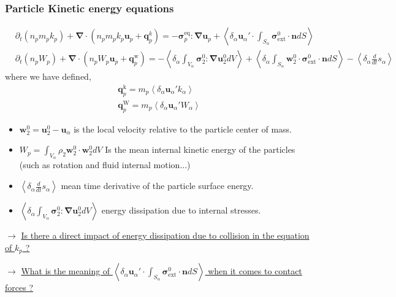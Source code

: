 \documentclass{sintefbeamer}
\newcommand{\pavg}[1]{\left<\delta_\alpha #1\right>}
\newcommand{\ddt}{\frac{d}{d t}}
\newcommand{\pddt}{\partial_t}
\newcommand{\grad}{\mathbf{\nabla}}
\renewcommand{\div}{\mathbf{\nabla}\cdot}
\newcommand{\intO}[1]{\int_{V_\alpha} #1 dV}
\newcommand{\intS}[1]{\int_{S_\alpha} #1 dS}
\newcommand{\pOavg}[1]{\pavg{\intO{#1}}}
\newcommand{\pSavg}[1]{\pavg{\intS{#1}}}
\begin{document}
\begin{frame}
  \frametitle{Particle Kinetic energy equations }
  \footnotesize
  \begin{align*}
    &\pddt \left(n_p m_p k_p\right)
    + \div \left(n_p
    m_p k_p \textbf{u}_p 
    + \textbf{q}^k_p
    \right)
    = 
    - \bm{\sigma}_p^\text{eq}  :\grad \textbf{u}_p
    + \pavg{\textbf{u}_\alpha'\cdot\intS{\bm{\sigma}_\text{ext}^0 \cdot \textbf{n}}}\\
    &\pddt \left(n_p W_p\right)
    + \div 
    (n_p W_p
    \textbf{u}_p 
    +  \textbf{q}_p^\text{w}
    )
    = 
    - \pOavg{{\bm{\sigma}_2^0 : \grad\textbf{u}_2^0}}
    + \pSavg{{\textbf{w}_2^0 \cdot \bm{\sigma}_\text{ext}^0 \cdot  \textbf{n}}}
    - \pavg{\ddt{ s_\alpha}}
\end{align*}
where we have defined, 
\begin{align*}
    \textbf{q}_p^\text{k}
    = m_p \pavg{\textbf{u}_\alpha' k_\alpha} \\
    \textbf{q}_p^\text{W}
    = m_p \pavg{\textbf{u}_\alpha' W_\alpha} 
\end{align*}

\begin{itemize}
  \item $\textbf{w}_2^0 = \textbf{u}_2^0 - \textbf{u}_\alpha$ is the local velocity relative to the particle center of mass. 
  \item $W_p = \intO{\rho_2\textbf{w}_2^0\cdot \textbf{w}_2^0}$
  Is the mean internal kinetic energy of the particles (such as rotation and fluid internal motion...)
  \item $\pavg{\ddt{ s_\alpha}}$ mean time derivative of the particle surface energy. 
  \item $\pOavg{{\bm{\sigma}_2^0 : \grad\textbf{u}_2^0}}$ energy dissipation due to internal stresses. 
\end{itemize}

$\to$ \underline{Is there a direct impact of  energy dissipation due to collision in the equation  of  $k_p$ ?
}

$\to$ \underline{What is the meaning of $\pavg{\textbf{u}_\alpha'\cdot\intS{\bm{\sigma}_\text{ext}^0 \cdot \textbf{n}}}$ when it comes to contact forces  ?}
\end{frame}
\end{document}
